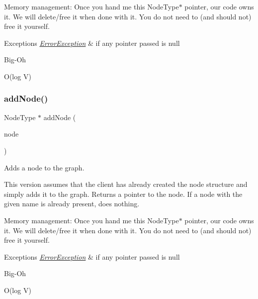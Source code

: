 Memory management\+: Once you hand me this Node\+Type$\ast$ pointer, our code owns it. We will delete/free it when done with it. You do not need to (and should not) free it yourself.


\begin{DoxyExceptions}{Exceptions}
{\em \mbox{\hyperlink{classErrorException}{Error\+Exception}}} & if any pointer passed is null \\
\hline
\end{DoxyExceptions}
\begin{DoxyRefDesc}{Big-\/\+Oh}
\item[\mbox{\hyperlink{BigOh__BigOh000045}{Big-\/\+Oh}}]O(log V) \end{DoxyRefDesc}
\mbox{\label{classGraph_a635fa78d72315816cef6c091acfa3882}} 
\subsubsection{\texorpdfstring{add\+Node()}{addNode()}\hspace{0.1cm}{\footnotesize\ttfamily [2/2]}}
{\footnotesize\ttfamily Node\+Type $\ast$ add\+Node (\begin{DoxyParamCaption}\item[{Node\+Type $\ast$}]{node }\end{DoxyParamCaption})}



Adds a node to the graph. 

This version assumes that the client has already created the node structure and simply adds it to the graph. Returns a pointer to the node. If a node with the given name is already present, does nothing.

Memory management\+: Once you hand me this Node\+Type$\ast$ pointer, our code owns it. We will delete/free it when done with it. You do not need to (and should not) free it yourself.


\begin{DoxyExceptions}{Exceptions}
{\em \mbox{\hyperlink{classErrorException}{Error\+Exception}}} & if any pointer passed is null \\
\hline
\end{DoxyExceptions}
\begin{DoxyRefDesc}{Big-\/\+Oh}
\item[\mbox{\hyperlink{BigOh__BigOh000046}{Big-\/\+Oh}}]O(log V) \end{DoxyRefDesc}
\mbox{\label{classGraph_ac0b108b3354f5222d2c829dcd639fa7a}} 
